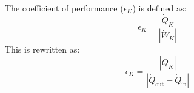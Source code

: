The coefficient of performance (\(\epsilon_K\)) is defined as:  
\[
\epsilon_K = \frac{\dot{Q}_K}{|\dot{W}_K|}
\]  
This is rewritten as:  
\[
\epsilon_K = \frac{|\dot{Q}_K|}{|\dot{Q}_{\text{out}} - \dot{Q}_{\text{in}}|}
\]